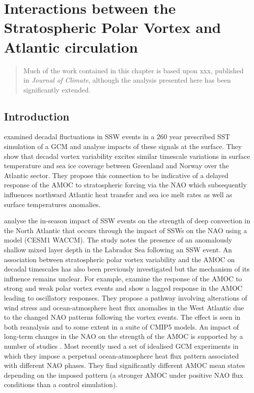 \chapter{Interactions between the Stratospheric Polar Vortex and Atlantic circulation} 
\begin{quotation}
  Much of the work contained in this chapter is based upon xxx,
  published in \emph{Journal of Climate}, although the analysis
  presented here has been significantly extended.
\end{quotation}

\label{cha:moments}


\section{Introduction}

\cite{manziniStratospheretroposphere2012} examined decadal fluctuations in SSW events in a 260 year prescribed SST simulation of a GCM and analyse impacts of these signals at the surface. They show that decadal vortex variability excites similar timescale variations in surface temperature and sea ice coverage between Greenland and Norway over the Atlantic sector. They propose this connection to be indicative of a delayed response of the AMOC to stratospheric forcing via the NAO which  subsequently influences northward Atlantic heat transfer and sea ice melt rates as well as surface temperatures anomalies. 


\cite{haaseImportance2018} analyse the in-season impact of SSW events on the strength of deep convection in the North Atlantic that occurs through the impact of SSWs on the NAO using a model (CESM1 WACCM). The study notes the presence of an anomalously shallow  mixed layer depth in the Labrador Sea following an SSW event. 
An association between stratospheric polar vortex variability and the AMOC on decadal timescales has also been previously investigated \citep{reichlerStratospheric2012, schimankeMultidecadal2011} but the mechanism of its influence remains unclear. For example, \cite{reichlerStratospheric2012} examine the response of the AMOC to strong and weak polar vortex events and show a lagged response in the AMOC leading to oscillatory responses. They propose a pathway involving alterations of wind stress and ocean-atmosphere heat flux anomalies in the West Atlantic due to the changed NAO patterns following the vortex events. The effect is seen in both reanalysis and to some extent in a suite of CMIP5 models. An impact of long-term changes in the NAO on the strength of the AMOC is supported by a number of studies \citep{visbeckOcean1998, delworthImplications2000, delworthMultidecadal2000, edenMechanism2001}. Most recently \cite{delworthImpact2016} used a set of idealised GCM experiments in which they impose a perpetual ocean-atmosphere heat flux pattern associated with different NAO phases. They find significantly different AMOC mean states depending on the imposed pattern (a stronger AMOC under positive NAO flux conditions than a control simulation). 



